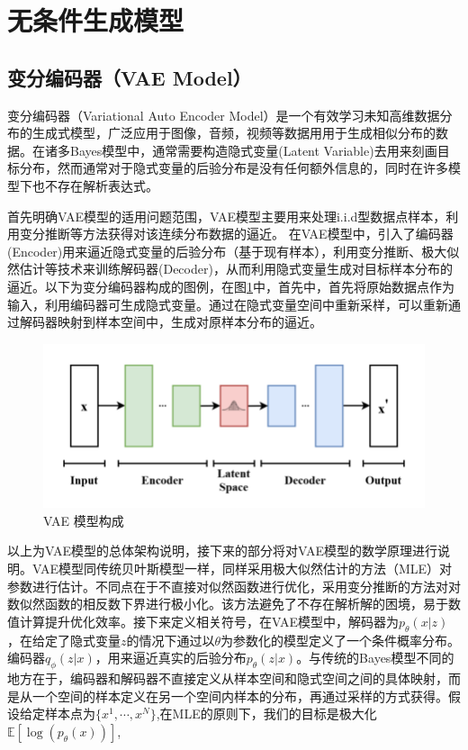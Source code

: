 \section{无条件生成模型}
\subsection{变分编码器（VAE Model）}
变分编码器（Variational Auto Encoder Model）是一个有效学习未知高维数据分布的生成式模型，广泛应用于图像，音频，视频等数据用用于生成相似分布的数据。在诸多Bayes模型中，通常需要构造隐式变量(Latent Variable)去用来刻画目标分布，然而通常对于隐式变量的后验分布是没有任何额外信息的，同时在许多模型下也不存在解析表达式。\par 
首先明确VAE模型的适用问题范围，VAE模型主要用来处理i.i.d型数据点样本，利用变分推断等方法获得对该连续分布数据的逼近。
在VAE模型中，引入了编码器(Encoder)用来逼近隐式变量的后验分布（基于现有样本），利用变分推断、极大似然估计等技术来训练解码器(Decoder)，从而利用隐式变量生成对目标样本分布的逼近。以下为变分编码器构成的图例，在图\ref{VAE model fig}中，首先中，首先将原始数据点作为输入，利用编码器可生成隐式变量。通过在隐式变量空间中重新采样，可以重新通过解码器映射到样本空间中，生成对原样本分布的逼近。
\begin{figure}[H]
    \centering
    \includegraphics[scale = 0.7]{Picture/VAE.png}
    \caption{VAE 模型构成}
    \label{VAE model fig}
\end{figure}
以上为VAE模型的总体架构说明，接下来的部分将对VAE模型的数学原理进行说明。VAE模型同传统贝叶斯模型一样，同样采用极大似然估计的方法（MLE）对参数进行估计。不同点在于不直接对似然函数进行优化，采用变分推断的方法对对数似然函数的相反数下界进行极小化。该方法避免了不存在解析解的困境，易于数值计算提升优化效率。接下来定义相关符号，在VAE模型中，解码器为$p_{\theta}(x|z)$，在给定了隐式变量$z$的情况下通过以$\theta$为参数化的模型定义了一个条件概率分布。编码器$q_{\phi}(z|x)$，用来逼近真实的后验分布$p_{\theta}(z|x)$。与传统的Bayes模型不同的地方在于，编码器和解码器不直接定义从样本空间和隐式空间之间的具体映射，而是从一个空间的样本定义在另一个空间内样本的分布，再通过采样的方式获得。假设给定样本点为$\{x^1,\cdots,x^{N}\}$,在MLE的原则下，我们的目标是极大化$\mathbb{E}[\log(p_{\theta}(x))]$,
